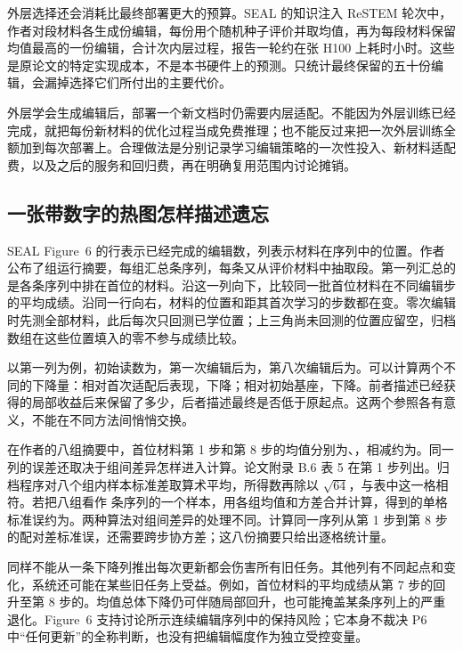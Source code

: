 外层选择还会消耗比最终部署更大的预算。SEAL 的知识注入 ReSTEM 轮次中，作者对段材料各生成份编辑，每份用个随机种子评价并取均值，再为每段材料保留均值最高的一份编辑，合计次内层过程，报告一轮约在张 H100 上耗时小时\cite{seal-2506}。这些是原论文的特定实现成本，不是本书硬件上的预测。只统计最终保留的五十份编辑，会漏掉选择它们所付出的主要代价。

外层学会生成编辑后，部署一个新文档时仍需要内层适配。不能因为外层训练已经完成，就把每份新材料的优化过程当成免费推理；也不能反过来把一次外层训练全额加到每次部署上。合理做法是分别记录学习编辑策略的一次性投入、新材料适配费，以及之后的服务和回归费，再在明确复用范围内讨论摊销。

\subsection{一张带数字的热图怎样描述遗忘}
\label{sec:ch10-retentionmatrix}

SEAL Figure~6 的行表示已经完成的编辑数，列表示材料在序列中的位置。作者公布了组运行摘要，每组汇总条序列，每条又从评价材料中抽取段\cite{seal-continual-archive-2025}。第一列汇总的是各条序列中排在首位的材料。沿这一列向下，比较同一批首位材料在不同编辑步的平均成绩。沿同一行向右，材料的位置和距其首次学习的步数都在变。零次编辑时先测全部材料，此后每次只回测已学位置；上三角尚未回测的位置应留空，归档数组在这些位置填入的零不参与成绩比较。

以第一列为例，初始读数为，第一次编辑后为，第八次编辑后为。可以计算两个不同的下降量：相对首次适配后表现，下降；相对初始基座，下降。前者描述已经获得的局部收益后来保留了多少，后者描述最终是否低于原起点。这两个参照各有意义，不能在不同方法间悄悄交换。

在作者的八组摘要中，首位材料第 1 步和第 8 步的均值分别为、，相减约为。同一列的误差还取决于组间差异怎样进入计算。论文附录 B.6 表 5 在第 1 步列出。归档程序对八个组内样本标准差取算术平均，所得数再除以 $\sqrt{64}$，与表中这一格相符。若把八组看作  条序列的一个样本，用各组均值和方差合并计算，得到的单格标准误约为\cite{seal-continual-archive-2025}。两种算法对组间差异的处理不同。计算同一序列从第 1 步到第 8 步的配对差标准误，还需要跨步协方差；这八份摘要只给出逐格统计量。

同样不能从一条下降列推出每次更新都会伤害所有旧任务。其他列有不同起点和变化，系统还可能在某些旧任务上受益。例如，首位材料的平均成绩从第 7 步的回升至第 8 步的。均值总体下降仍可伴随局部回升，也可能掩盖某条序列上的严重退化。Figure~6 支持讨论所示连续编辑序列中的保持风险；它本身不裁决 P6 中“任何更新”的全称判断，也没有把编辑幅度作为独立受控变量。

